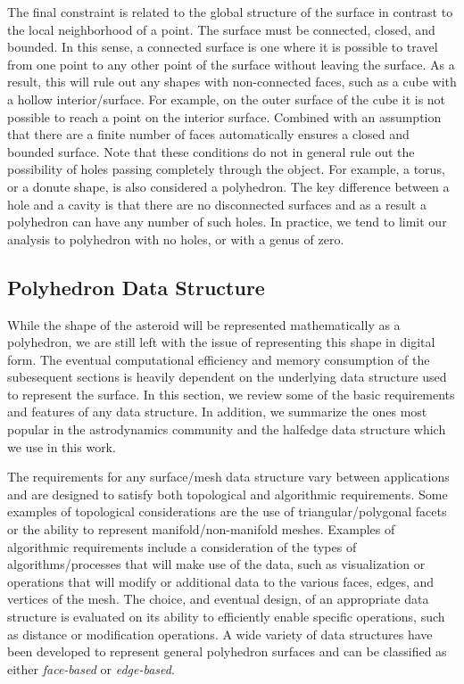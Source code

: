 The final constraint is related to the global structure of the surface in contrast to the local neighborhood of a point.
The surface must be connected, closed, and bounded.
In this sense, a connected surface is one where it is possible to travel from one point to any other point of the surface without leaving the surface. 
As a result, this will rule out any shapes with non-connected faces, such as a cube with a hollow interior/surface.
For example, on the outer surface of the cube it is not possible to reach a point on the interior surface. 
Combined with an assumption that there are a finite number of faces automatically ensures a closed and bounded surface. 
Note that these conditions do not in general rule out the possibility of holes passing completely through the object.
For example, a torus, or a donute shape, is also considered a polyhedron.
The key difference between a hole and a cavity is that there are no disconnected surfaces and as a result a polyhedron can have any number of such holes. 
In practice, we tend to limit our analysis to polyhedron with no holes, or with a genus of zero.

\subsection{Polyhedron Data Structure}
While the shape of the asteroid will be represented mathematically as a polyhedron, we are still left with the issue of representing this shape in digital form. 
The eventual computational efficiency and memory consumption of the subesequent sections is heavily dependent on the underlying data structure used to represent the surface.
In this section, we review some of the basic requirements and features of any data structure.
In addition, we summarize the ones most popular in the astrodynamics community and the halfedge data structure which we use in this work.

The requirements for any surface/mesh data structure vary between applications and are designed to satisfy both topological and algorithmic requirements.
Some examples of topological considerations are the use of triangular/polygonal facets or the ability to represent manifold/non-manifold meshes.
Examples of algorithmic requirements include a consideration of the types of algorithms/processes that will make use of the data, such as visualization or operations that will modify or additional data to the various faces, edges, and vertices of the mesh.
The choice, and eventual design, of an appropriate data structure is evaluated on its ability to efficiently enable specific operations, such as distance or modification operations.
A wide variety of data structures have been developed to represent general polyhedron surfaces and can be classified as either \textit{face-based} or \textit{edge-based}.

